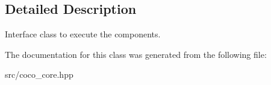 \subsection{Detailed Description}
Interface class to execute the components. 

The documentation for this class was generated from the following file\+:\begin{DoxyCompactItemize}
\item 
src/coco\+\_\+core.\+hpp\end{DoxyCompactItemize}
